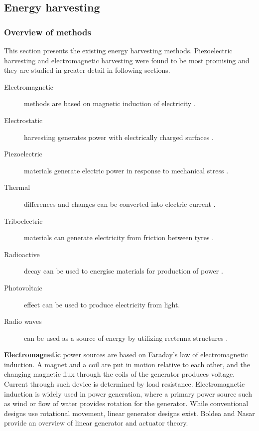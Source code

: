 \subsection{Energy harvesting}
\subsubsection{Overview of methods} \label{sect:overview}
This section presents the existing energy harvesting methods. Piezoelectric harvesting and electromagnetic harvesting were found to be most promising and they are studied in greater detail in following sections.

\begin{description}
  \item[Electromagnetic] methods are based on magnetic induction of electricity \cite{Kubba2014}.
  \item[Electrostatic] harvesting generates power with electrically charged surfaces \cite{Kubba2014}.
  \item[Piezoelectric] materials generate electric power in response to mechanical stress \cite{Kubba2014}.
  \item[Thermal] differences and changes can be converted into electric current \cite{Bowen2014}.
  \item[Triboelectric] materials can generate electricity from friction between tyres \cite{Bowen2014}.
  \item[Radioactive] decay can be used to energise materials for production of power \cite{Lal2004}.
  \item[Photovoltaic] effect can be used to produce electricity from light.
  \item[Radio waves] can be used as a source of energy by utilizing rectenna structures \cite{Patel2014}. 
\end{description}

\textbf{Electromagnetic} power sources are based on Faraday's law of electromagnetic induction. A magnet and a coil are put in motion relative to each other, and the changing magnetic flux through the coils of the generator produces voltage. Current through such device is determined by load resistance. Electromagnetic induction is widely used in power generation, where a primary power source such as wind or flow of water provides rotation for the generator. While conventional designs use rotational movement, linear generator designs exist. Boldea and Nasar \cite{Boldea1999} provide an overview of linear generator and actuator theory. 

